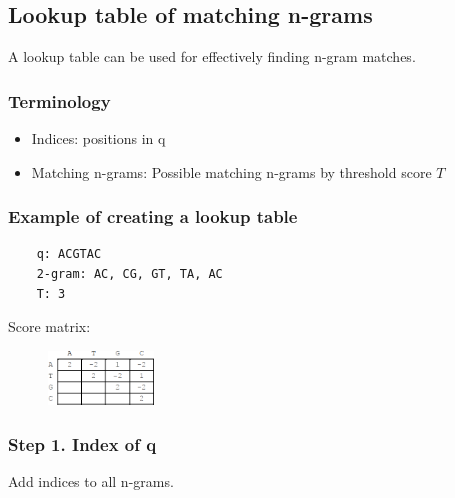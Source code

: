 %
% 

%
%
\subsection{Lookup table of matching n-grams}
A lookup table can be used for effectively finding n-gram matches.

%
%
\subsubsection*{Terminology} 
\begin{itemize}
\item Indices: positions in q
\item Matching n-grams: Possible matching n-grams by threshold score $T$
\end{itemize}

%
%
\subsubsection*{Example of creating a lookup table} 

\begin{multicols}{2}
\begin{verbatim}
    q: ACGTAC 
    2-gram: AC, CG, GT, TA, AC
    T: 3
\end{verbatim}
\vfill\null
\columnbreak

Score matrix:
\begin{figure}[H]
      \includegraphics[width=0.25\textwidth]{fig05/score_matrix.png}
\end{figure}

\end{multicols} 

\medskip  

%
%
\subsubsection*{Step 1. Index of q} 
Add indices to all n-grams.

